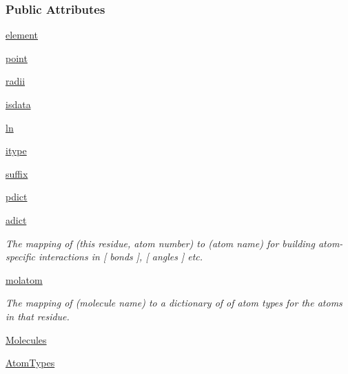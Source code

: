 \subsubsection*{\-Public \-Attributes}
\begin{DoxyCompactItemize}
\item 
\hyperlink{classforcebalance_1_1psi4io_1_1Grid__Reader_ab0af756f703680fed332bd5cd0176a06}{element}
\item 
\hyperlink{classforcebalance_1_1psi4io_1_1Grid__Reader_ae3f17a9dbd90facf810b67135a627856}{point}
\item 
\hyperlink{classforcebalance_1_1psi4io_1_1Grid__Reader_a9a2872913fab88d4a8586123f66b6f41}{radii}
\item 
\hyperlink{classforcebalance_1_1psi4io_1_1Grid__Reader_ad35c7fc05cdcd20f7904908a5b4009eb}{isdata}
\item 
\hyperlink{classforcebalance_1_1BaseReader_a80c8e3bea212600742968aa8669e557b}{ln}
\item 
\hyperlink{classforcebalance_1_1BaseReader_a22ff3f4c684c728e019d801fface36f6}{itype}
\item 
\hyperlink{classforcebalance_1_1BaseReader_a48ef0584a1b6b4b6f8eb741ad8465db8}{suffix}
\item 
\hyperlink{classforcebalance_1_1BaseReader_aaf18c900d6055ed4b5124f6bb26164c1}{pdict}
\item 
\hyperlink{classforcebalance_1_1BaseReader_a2c46ad6b66cf09a30e917ce4a1997e2a}{adict}
\begin{DoxyCompactList}\small\item\em \-The mapping of (this residue, atom number) to (atom name) for building atom-\/specific interactions in \mbox{[} bonds \mbox{]}, \mbox{[} angles \mbox{]} etc. \end{DoxyCompactList}\item 
\hyperlink{classforcebalance_1_1BaseReader_ab444c213e15929253dd73395ac5f19fc}{molatom}
\begin{DoxyCompactList}\small\item\em \-The mapping of (molecule name) to a dictionary of of atom types for the atoms in that residue. \end{DoxyCompactList}\item 
\hyperlink{classforcebalance_1_1BaseReader_a4369b5fb663a83b11602daa71db6862e}{\-Molecules}
\item 
\hyperlink{classforcebalance_1_1BaseReader_a69ca7d949a4a3df4d9f61e617fe0e270}{\-Atom\-Types}
\end{DoxyCompactItemize}


